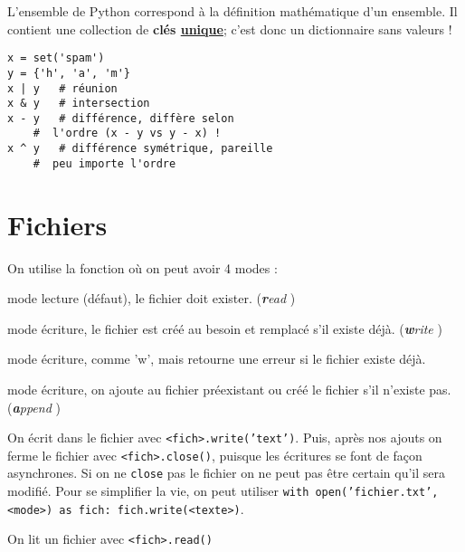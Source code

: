 \documentclass[10pt, french]{article}
\begin{document}
\begin{multicols*}{2}
\begin{definitionNOHFILL}
L'ensemble de Python correspond à la définition mathématique d'un ensemble. Il contient une collection de \textbf{clés \underline{unique}}; c'est donc un dictionnaire sans valeurs ! 

\bigskip

\begin{definitionNOHFILLprop}
\begin{lstlisting}
x = set('spam')
y = {'h', 'a', 'm'}
x | y	# réunion
x & y	# intersection
x - y	# différence, diffère selon 
	#  l'ordre (x - y vs y - x) ! 
x ^ y	# différence symétrique, pareille 
	#  peu importe l'ordre
\end{lstlisting}
\end{definitionNOHFILLprop}
\end{definitionNOHFILL}



\newpage
\section{Fichiers}
On utilise la fonction  où on peut avoir 4 modes : 
\begin{description}[font = \ttfamily]
	\item['r']	mode lecture (défaut), le fichier doit exister. (\og \textit{\textbf{r}ead} \fg{})
	\item['w']	mode écriture, le fichier est créé au besoin et remplacé s'il existe déjà. (\og \textit{\textbf{w}rite} \fg{})
	\item['x']	mode écriture, comme 'w', mais retourne une erreur si le fichier existe déjà.
	\item['a']	mode écriture, on ajoute au fichier préexistant ou créé le fichier s'il n'existe pas. (\og \textit{\textbf{a}ppend} \fg{})
\end{description}

On écrit dans le fichier avec \texttt{<fich>.write('text')}. Puis, après nos ajouts on ferme le fichier avec \texttt{<fich>.close()}, puisque les écritures se font de façon asynchrones. Si on ne \texttt{close} pas le fichier on ne peut pas être certain qu'il sera modifié. Pour se simplifier la vie, on peut utiliser \texttt{with open('fichier.txt', <mode>) as fich: fich.write(<texte>)}.

\bigskip

On lit un fichier avec \texttt{<fich>.read()}




\end{multicols*}
\end{document}
